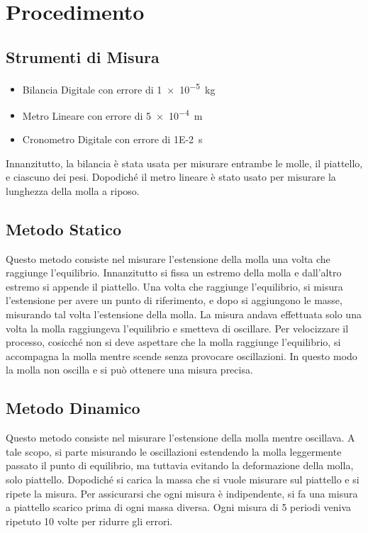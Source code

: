 \documentclass[a4paper]{article}
\begin{document}
\section{Procedimento}
\subsection{Strumenti di Misura}
\begin{itemize}
    \item Bilancia Digitale con errore di \SI{1e-5}{\kilogram}
    \item Metro Lineare con errore di \SI{5e-4}{\meter}
    \item Cronometro Digitale con errore di \SI{1E-2}{\second}
\end{itemize}
Innanzitutto, la bilancia è stata usata per misurare entrambe le molle, il piattello, e ciascuno dei pesi. Dopodiché il metro lineare è stato usato per misurare la lunghezza della molla a riposo. 
\subsection{Metodo Statico}
Questo metodo consiste nel misurare l'estensione della molla una volta che raggiunge l'equilibrio. Innanzitutto si fissa un estremo della molla e dall'altro estremo si appende il piattello. Una volta che raggiunge l'equilibrio, si misura l'estensione per avere un punto di riferimento, e dopo si aggiungono le masse, misurando tal volta l'estensione della molla. La misura andava effettuata solo una volta la molla raggiungeva l'equilibrio e smetteva di oscillare. Per velocizzare il processo, cosicché non si deve aspettare che la molla raggiunge l'equilibrio, si accompagna la molla mentre scende senza provocare oscillazioni. In questo modo la molla non oscilla e si può ottenere una misura precisa. 
\subsection{Metodo Dinamico}
Questo metodo consiste nel misurare l'estensione della molla mentre oscillava. A tale scopo, si parte misurando le oscillazioni estendendo la molla leggermente passato il punto di equilibrio, ma tuttavia evitando la deformazione della molla, solo piattello. Dopodiché si carica la massa che si vuole misurare sul piattello e si ripete la misura. Per assicurarsi che ogni misura è indipendente, si fa una misura a piattello scarico prima di ogni massa diversa. Ogni misura di 5 periodi veniva ripetuto 10 volte per ridurre gli errori. 
\end{document}
